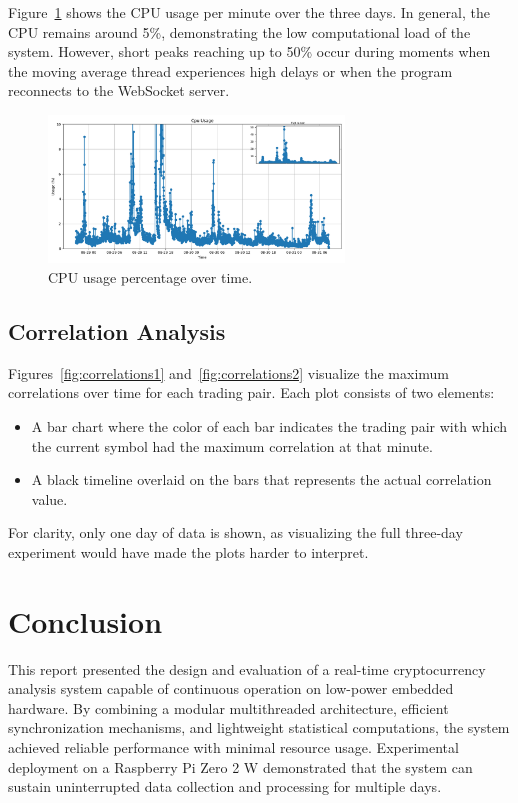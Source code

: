 \documentclass[11pt]{article}
\begin{document}
Figure~\ref{fig:cpu-usage} shows the CPU usage per minute over the three days. In general, the CPU remains around 5\%, demonstrating the low computational load of the system. However, short peaks reaching up to 50\% occur during moments when the moving average thread experiences high delays or when the program reconnects to the WebSocket server.

\begin{figure}[h]
    \centering
    \includegraphics[width=0.7\textwidth]{../assets/CPU-usage.png}
    \caption{CPU usage percentage over time.}
    \label{fig:cpu-usage}
\end{figure}

\subsection{Correlation Analysis}

Figures~\ref{fig:correlations1} and~\ref{fig:correlations2} visualize the maximum correlations over time for each trading pair.
Each plot consists of two elements:

\begin{itemize}
    \item A bar chart where the color of each bar indicates the trading pair with which the current symbol had the maximum correlation at that minute.
    
    \item A black timeline overlaid on the bars that represents the actual correlation value.
\end{itemize}

For clarity, only one day of data is shown, as visualizing the full three-day experiment would have made the plots harder to interpret.

\section{Conclusion}

This report presented the design and evaluation of a real-time cryptocurrency analysis system capable of continuous operation on low-power embedded hardware. By combining a modular multithreaded architecture, efficient synchronization mechanisms, and lightweight statistical computations, the system achieved reliable performance with minimal resource usage. Experimental deployment on a Raspberry Pi Zero 2 W demonstrated that the system can sustain uninterrupted data collection and processing for multiple days.
\end{document}
